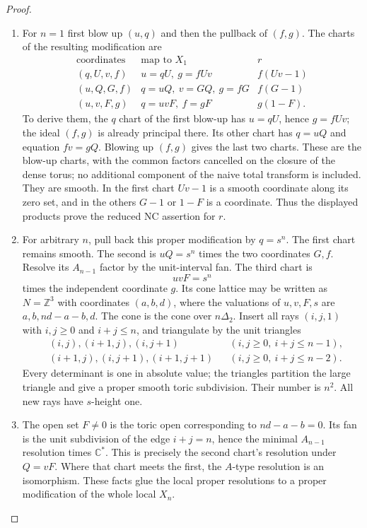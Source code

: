 \begin{proof}
\begin{enumerate}[label=\arabic*.,leftmargin=*]
\item For $n=1$ first blow up $(u,q)$ and then the pullback
of $(f,g)$. The charts of the resulting modification are
\[
\begin{array}{c|c|c}
 \text{coordinates}&\text{map to }X_1&r\\\hline
 (q,U,v,f)&u=qU,\ g=fUv&f(Uv-1)\\
 (u,Q,G,f)&q=uQ,\ v=GQ,\ g=fG&f(G-1)\\
 (u,v,F,g)&q=uvF,\ f=gF&g(1-F).
\end{array}
\]
To derive them, the $q$ chart of the first blow-up
has $u=qU$, hence $g=fUv$; the ideal $(f,g)$ is
already principal there. Its other chart has
$q=uQ$ and equation $fv=gQ$. Blowing up $(f,g)$
gives the last two charts. These are the 
blow-up charts, with the common factors cancelled
on the closure of the dense torus; no additional
component of the naive total transform is included.
They are smooth. In the first chart $Uv-1$ is a
smooth coordinate along its zero set, and in the
others $G-1$ or $1-F$ is a coordinate. Thus the
displayed products prove the reduced NC assertion
for $r$.

\item For arbitrary $n$, pull back this proper modification
by $q=s^n$. The first chart remains smooth. The
second is $uQ=s^n$ times the two coordinates $G,f$.
Resolve its $A_{n-1}$ factor by the unit-interval fan.
The third chart is
\[
 uvF=s^n
\]
times the independent coordinate $g$. Its cone lattice
may be written as $N=\mathbb Z^3$ with coordinates
$(a,b,d)$, where the valuations of $u,v,F,s$ are
$a,b,nd-a-b,d$. The cone is the cone over
$n\Delta_2$. Insert all rays $(i,j,1)$ with
$i,j\ge0$ and $i+j\le n$, and triangulate by the
unit triangles
\[
\begin{aligned}
 &(i,j),(i+1,j),(i,j+1) &&(i,j\ge0,\ i+j\le n-1),\\
 &(i+1,j),(i,j+1),(i+1,j+1)
                       &&(i,j\ge0,\ i+j\le n-2).
\end{aligned}
\]
Every determinant is one in absolute value; the
triangles partition the large triangle and give a
proper smooth toric subdivision. Their number is
$n^2$. All new rays have $s$-height one.

\item The open set $F\ne0$ is the toric open corresponding
to $nd-a-b=0$. Its fan is the unit subdivision of
the edge $i+j=n$, hence the minimal $A_{n-1}$
resolution times $\mathbb C^*$. This is precisely
the second chart's resolution under $Q=vF$.
Where that chart meets the first, the $A$-type
resolution is an isomorphism. These facts glue
the local proper resolutions to a proper
modification of the whole local $X_n$.


\end{enumerate}
\end{proof}
